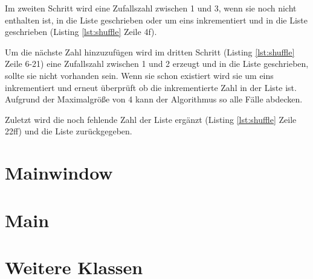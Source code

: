 Im zweiten Schritt wird eine Zufallszahl zwischen 1 und 3, wenn sie noch nicht enthalten ist, in die Liste geschrieben oder um eins inkrementiert und in die Liste geschrieben (Listing \ref{lst:shuffle} Zeile 4f). 

Um die nächste Zahl hinzuzufügen wird im dritten Schritt (Listing \ref{lst:shuffle} Zeile 6-21) eine Zufallszahl zwischen 1 und 2 erzeugt und in die Liste geschrieben, sollte sie nicht vorhanden sein. Wenn sie schon existiert wird sie um eins inkrementiert und erneut überprüft ob die inkrementierte Zahl in der Liste ist. Aufgrund der Maximalgröße von 4 kann der Algorithmus so alle Fälle abdecken.
 
Zuletzt wird die noch fehlende Zahl der Liste ergänzt (Listing \ref{lst:shuffle} Zeile 22ff) und die Liste zurückgegeben. 

\section{Mainwindow}

\section{Main}
\label{sec:Main}
\section{Weitere Klassen}


